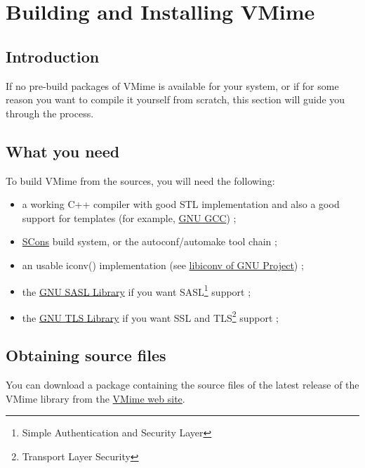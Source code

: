 \chapter{Building and Installing VMime\label{chapter_building}}

\section{Introduction}

If no pre-build packages of VMime is available for your system, or if for some
reason you want to compile it yourself from scratch, this section will guide
you through the process.

\section{What you need}

To build VMime from the sources, you will need the following:

\begin{itemize}
\item a working C++ compiler with good STL implementation and also a good
support for templates (for example, \href{http://gcc.gnu.org/}{GNU GCC}) ;
\item \href{http://www.scons.org/}{SCons} build system, or the
autoconf/automake tool chain ;
\item an usable iconv() implementation (see
\href{http://www.gnu.org/software/libiconv/}{libiconv of GNU Project}) ;
\item the \href{http://www.gnu.org/software/gsasl/}{GNU SASL Library} if you
want SASL\footnote{Simple Authentication and Security Layer} support ;
\item the \href{http://www.gnu.org/software/gnutls/}{GNU TLS Library} if you
want SSL and TLS\footnote{Transport Layer Security} support ;
\end{itemize}

\section{Obtaining source files}

You can download a package containing the source files of the latest release
of the VMime library from the \href{http://www.vmime.org/}{VMime web site}.

